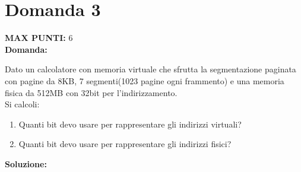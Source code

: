 \documentclass{article}
\begin{document}
    \section*{Domanda 3}
    \textbf{MAX PUNTI:} 6\\
    \textbf{Domanda:}


    Dato un calcolatore con memoria virtuale che sfrutta la segmentazione paginata con pagine da 8KB, 7 segmenti(1023 pagine ogni frammento) e una memoria fisica da 512MB con 32bit per l'indirizzamento.\\
    Si calcoli:
    \begin{enumerate}
        \item Quanti bit devo usare per rappresentare gli indirizzi virtuali?
        \item Quanti bit devo usare per rappresentare gli indirizzi fisici?
    \end{enumerate}
    \textbf{Soluzione:}


    
\end{document}
